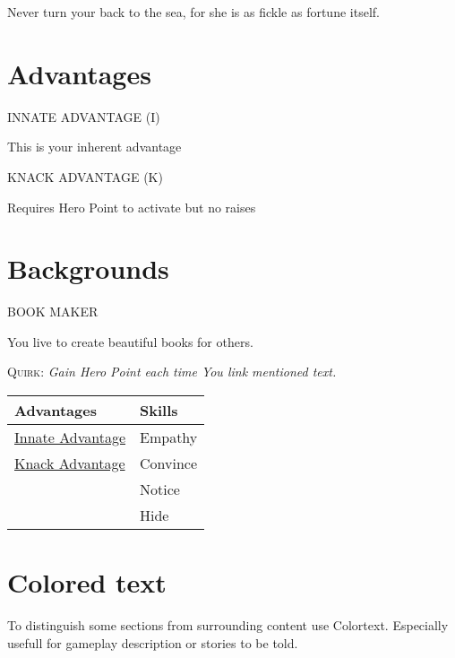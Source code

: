\documentclass[10pt,a4paper,twoside,twocolumn,openany]{book}
\renewcommand{\arraystretch}{1.5}  %
\newcommand{\BGHeader}[1]{\begin{bgbox}\noindent\large \textsc{\MakeUppercase{#1}}\end{bgbox}}
\newcommand{\Quirk}[2]{\medskip \noindent \textsc{#1}: \textit{#2}}
\begin{document}
    \begin{Citation}{Never turn your back to the sea, for she is as fickle as fortune itself.}
    \end{Citation}

    \section{Advantages}
    \hypertarget{a:innateadvantage}{\BGHeader{Innate Advantage (I)}}
    This is your inherent advantage
    
    \hypertarget{a:knackadvantage}{\BGHeader{Knack Advantage (K)}}
    Requires Hero Point to activate but no raises
    
    \newpage
    \section{Backgrounds}
    \BGHeader{Book Maker} 
    \noindent You live to create beautiful books for others.
    
    \Quirk{Quirk}{Gain Hero Point each time You link mentioned text.}

    
    \begin{table}[h]
        \centering
        \renewcommand{\arraystretch}{1.2} %
        \begin{tabular}{p{} p{}} %
            \textbf{Advantages} & \textbf{Skills} \\
            \hline
            \hyperlink{a:innateadvantage}{Innate Advantage} & Empathy \\
            \hyperlink{a:knackadvantage}{Knack Advantage} & Convince \\
            & Notice \\
            & Hide \\
            \hline
        \end{tabular}
    \end{table}
    


	\section{Colored text}
    \begin{ColorText}{
    	To distinguish some sections from surrounding content use Colortext. Especially usefull for gameplay description or stories to be told.
    }
    \end{ColorText}
    
\end{document}
